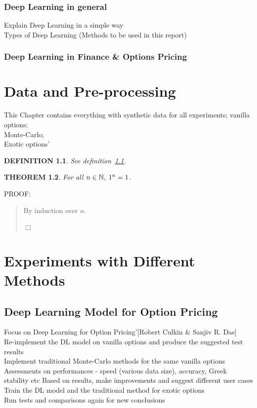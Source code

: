 \documentclass{report}
\newtheorem{theorem}{THEOREM}
\newtheorem{definition}[theorem]{DEFINITION}
\newenvironment{proof}{
PROOF:
\begin{quotation}}{
$\Box$ \end{quotation}}
\newcommand{\nats}{\mbox{\( \mathbb N \)}}
\begin{document}
\subsection{Deep Learning in general}
Explain Deep Learning in a simple way\\
Types of Deep Learning (Methods to be used in this report)
\subsection{Deep Learning in Finance & Options Pricing}


\chapter{Data and Pre-processing}
This Chapter contains everything with synthetic data for all experiments;
vanilla options;\\
Monte-Carlo;\\
Exotic options'\\

\begin{definition}\label{def}
See definition~\ref{def}.
\end{definition}
\begin{theorem}
For all $n\in\nats,\; 1^n=1$.
\end{theorem}
\begin{proof}
By induction over $n$.
\end{proof}

\chapter{Experiments with Different Methods}

\section{Deep Learning Model for Option Pricing}
Focus on Deep Learning for Option Pricing’[Robert Culkin & Sanjiv R. Das]\\
Re-implement the DL model on vanilla options and produce the suggested test results\\
Implement traditional Monte-Carlo methods for the same vanilla options \\
Assessments on performances - speed (various data size), accuracy, Greek stability etc
Based on results, make improvements and suggest different user cases\\
Train the DL model and the traditional method for exotic options\\
Run tests and comparisons again for new conclusions
\end{document}
